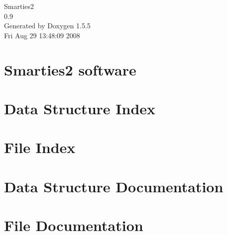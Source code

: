\documentclass[a4paper]{book}
\begin{document}
\begin{titlepage}
\vspace*{7cm}
\begin{center}
{\Large Smarties2 \\[1ex]\large 0.9 }\\
\vspace*{1cm}
{\large Generated by Doxygen 1.5.5}\\
\vspace*{0.5cm}
{\small Fri Aug 29 13:48:09 2008}\\
\end{center}
\end{titlepage}
\clearemptydoublepage
{}
\tableofcontents
\clearemptydoublepage
{}
\chapter{Smarties2 software }
\label{index}\hypertarget{index}{}
\chapter{Data Structure Index}

\chapter{File Index}

\chapter{Data Structure Documentation}













\chapter{File Documentation}












\printindex
\end{document}
